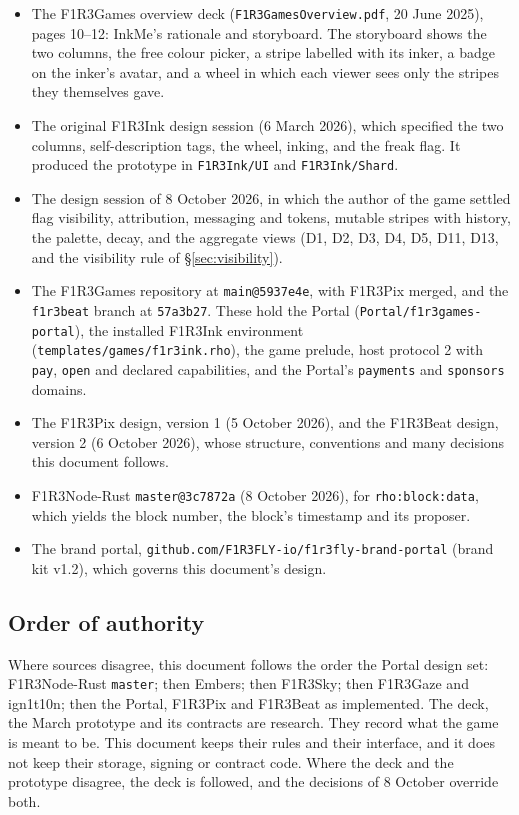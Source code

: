\documentclass[11pt,a4paper]{article}
\newcommand{\code}[1]{\texttt{#1}}
\begin{document}
\begin{itemize}[leftmargin=1.2em,itemsep=2pt]
\item The F1R3Games overview deck (\code{F1R3GamesOverview.pdf}, 20 June 2025), pages 10--12:
  InkMe's rationale and storyboard. The storyboard shows the two columns, the free colour picker,
  a stripe labelled with its inker, a badge on the inker's avatar, and a wheel in which each
  viewer sees only the stripes they themselves gave.
\item The original F1R3Ink design session (6 March 2026), which specified the two columns,
  self-description tags, the wheel, inking, and the freak flag. It produced the prototype in
  \code{F1R3Ink/UI} and \code{F1R3Ink/Shard}.
\item The design session of 8 October 2026, in which the author of the game settled flag
  visibility, attribution, messaging and tokens, mutable stripes with history, the palette,
  decay, and the aggregate views (D1, D2, D3, D4, D5, D11, D13, and the visibility rule of
  \S\ref{sec:visibility}).
\item The F1R3Games repository at \code{main@5937e4e}, with F1R3Pix merged, and the
  \code{f1r3beat} branch at \code{57a3b27}. These hold the Portal (\code{Portal/f1r3games-portal}),
  the installed F1R3Ink environment (\code{templates/games/f1r3ink.rho}), the game prelude,
  host protocol 2 with \code{pay}, \code{open} and declared capabilities, and the Portal's
  \code{payments} and \code{sponsors} domains.
\item The F1R3Pix design, version 1 (5 October 2026), and the F1R3Beat design, version 2
  (6 October 2026), whose structure, conventions and many decisions this document follows.
\item F1R3Node-Rust \code{master@3c7872a} (8 October 2026), for \code{rho:block:data}, which
  yields the block number, the block's timestamp and its proposer.
\item The brand portal, \code{github.com/F1R3FLY-io/f1r3fly-brand-portal} (brand kit v1.2),
  which governs this document's design.
\end{itemize}

\subsection{Order of authority}

Where sources disagree, this document follows the order the Portal design set: F1R3Node-Rust
\code{master}; then Embers; then F1R3Sky; then F1R3Gaze and ign1t10n; then the Portal, F1R3Pix
and F1R3Beat as implemented. The deck, the March prototype and its contracts are research. They
record what the game is meant to be. This document keeps their rules and their interface, and
it does not keep their storage, signing or contract code. Where the deck and the prototype
disagree, the deck is followed, and the decisions of 8 October override both.
\end{document}
